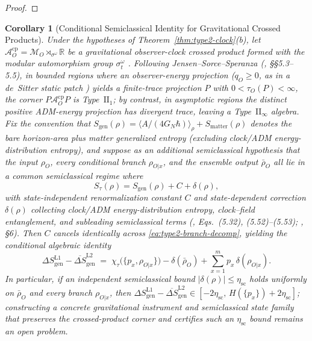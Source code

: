 \documentclass[11pt,a4paper]{article}
\newtheorem{corollary}{Corollary}
\theoremstyle{definition}
\theoremstyle{remark}
\newcommand{\cA}{\mathcal{A}}
\newcommand{\cM}{\mathcal{M}}
\newcommand{\bbR}{\mathbb{R}}
\newcommand{\1}{\mathbf{1}}
\begin{document}
\begin{proof}
\end{proof}

\begin{corollary}[Conditional Semiclassical Identity for Gravitational Crossed Products]\label{cor:grav-entropy}
Under the hypotheses of Theorem~\ref{thm:type2-clock}(b), let $\cA_O^{\mathrm{cp}}=\cM_O\rtimes_{\sigma^\omega}\bbR$ be a gravitational observer-clock crossed product formed with the modular automorphism group $\sigma^\omega_t$ \cite{Witten2022,JensenSorceSperanza2023}. Following Jensen--Sorce--Speranza (\cite{JensenSorceSperanza2023}, \S\S5.3--5.5), in bounded regions where an observer-energy projection ($q_O\ge 0$, as in a de~Sitter static patch \cite{CLPW2023}) yields a finite-trace projection $P$ with $0<\tau_O(P)<\infty$, the corner $P\cA_O^{\mathrm{cp}}P$ is Type~$\mathrm{II}_1$; by contrast, in asymptotic regions the distinct positive ADM-energy projection has divergent trace, leaving a Type~$\mathrm{II}_\infty$ algebra. Fix the convention that $S_{\mathrm{gen}}(\rho)=\langle A/(4G_N\hbar)\rangle_\rho + S_{\mathrm{matter}}(\rho)$ denotes the bare horizon-area plus matter generalized entropy (excluding clock/ADM energy-distribution entropy), and suppose as an additional semiclassical hypothesis that the input $\rho_O$, every conditional branch $\rho_{O|x}$, and the ensemble output $\bar{\rho}_O$ all lie in a common semiclassical regime where
\begin{equation}\label{eq:semiclassical-corr}
  S_\tau(\rho) = S_{\mathrm{gen}}(\rho) + C + \delta(\rho),
\end{equation}
with state-independent renormalization constant $C$ and state-dependent correction $\delta(\rho)$ collecting clock/ADM energy-distribution entropy, clock--field entanglement, and subleading semiclassical terms (\cite{JensenSorceSperanza2023}, Eqs.~(5.32), (5.52)--(5.53); \cite{DeVuyst2025}, \S6). Then $C$ cancels identically across \eqref{eq:type2-branch-decomp}, yielding the conditional algebraic identity
\begin{equation}\label{eq:grav-branch-split}
  \Delta S_{\mathrm{gen}}^{\mathrm{L1}} - \overline{\Delta S}_{\mathrm{gen}}^{\mathrm{L2}}
  \;=\; \chi_\tau\bigl(\{p_x,\rho_{O|x}\}\bigr) - \delta(\bar{\rho}_O) + \sum_{x=1}^m p_x\,\delta(\rho_{O|x}).
\end{equation}
In particular, if an independent semiclassical bound $|\delta(\rho)|\le\eta_{\mathrm{sc}}$ holds uniformly on $\bar{\rho}_O$ and every branch $\rho_{O|x}$, then $\Delta S_{\mathrm{gen}}^{\mathrm{L1}}-\overline{\Delta S}_{\mathrm{gen}}^{\mathrm{L2}}\in[-2\eta_{\mathrm{sc}},\,H(\{p_x\})+2\eta_{\mathrm{sc}}]$; constructing a concrete gravitational instrument and semiclassical state family that preserves the crossed-product corner and certifies such an $\eta_{\mathrm{sc}}$ bound remains an open problem.
\end{corollary}
\end{document}
